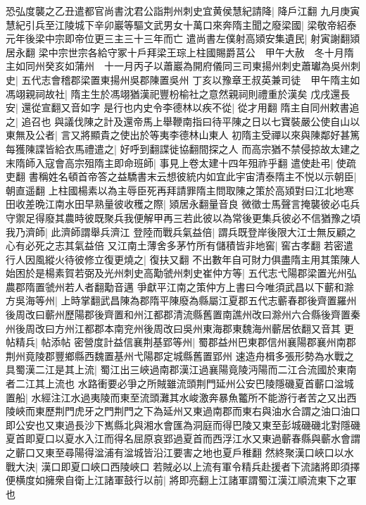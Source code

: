 恐弘度襲之乙丑遣都官尚書沈君公詣荆州刺史宜黄侯慧紀請降|{
	降戶江翻}
九月庚寅慧紀引兵至江陵城下辛卯巖等驅文武男女十萬口來奔隋主聞之廢梁國|{
	梁敬帝紹泰元年後梁中宗即帝位更三主三十三年而亡}
遣尚書左僕射高熲安集遺民|{
	射寅謝翻熲居永翻}
梁中宗世宗各給守冢十戶拜梁王琮上柱國賜爵莒公　甲午大赦　冬十月隋主如同州癸亥如蒲州　十一月丙子以蕭巖為開府儀同三司東揚州刺史蕭瓛為吳州刺史|{
	五代志會稽郡梁置東揚州吳郡陳置吳州}
丁亥以豫章王叔英兼司徒　甲午隋主如馮翊親祠故社|{
	隋主生於馮翊猶漢祀豐枌榆社之意然親祠則禮重於漢矣}
戊戌還長安|{
	還從宣翻又音如字}
是行也内史令李德林以疾不從|{
	從才用翻}
隋主自同州敕書追之|{
	追召也}
與議伐陳之計及還帝馬上舉鞭南指曰待平陳之日以七寶裝嚴公使自山以東無及公者|{
	言又將顯貴之使出於等夷李德林山東人}
初隋主受禪以來與陳鄰好甚篤每獲陳諜皆給衣馬禮遣之|{
	好呼到翻諜徙協翻間探之人}
而高宗猶不禁侵掠故太建之末隋師入寇會高宗殂隋主即命班師|{
	事見上卷太建十四年殂祚乎翻}
遣使赴弔|{
	使疏吏翻}
書稱姓名頓首帝答之益驕書末云想彼統内如宜此宇宙清泰隋主不悦以示朝臣|{
	朝直遥翻}
上柱國楊素以為主辱臣死再拜請罪隋主問取陳之策於高熲對曰江北地寒田收差晩江南水田早熟量彼收穫之際|{
	熲居永翻量音良}
微徵士馬聲言掩襲彼必屯兵守禦足得廢其農時彼既聚兵我便解甲再三若此彼以為常後更集兵彼必不信猶豫之頃我乃濟師|{
	此濟師謂舉兵濟江}
登陸而戰兵氣益倍|{
	謂兵既登岸後限大江士無反顧之心有必死之志其氣益倍}
又江南土薄舍多茅竹所有儲積皆非地窖|{
	窖古孝翻}
若密遣行人因風縱火待彼修立復更燒之|{
	復扶又翻}
不出數年自可財力俱盡隋主用其策陳人始困於是楊素賀若弼及光州刺史高勱虢州刺史崔仲方等|{
	五代志弋陽郡梁置光州弘農郡隋置虢州若人者翻勱音邁}
爭獻平江南之策仲方上書曰今唯須武昌以下蘄和滁方吳海等州|{
	上時掌翻武昌陳為郡隋平陳廢為縣屬江夏郡五代志蘄春郡後齊置羅州後周改曰蘄州歷陽郡後齊置和州江都郡清流縣舊置南譙州改曰滁州六合縣後齊置秦州後周改曰方州江都郡本南兖州後周改曰吳州東海郡東魏海州蘄居依翻又音其}
更帖精兵|{
	帖添帖}
密營度計益信襄荆基郢等州|{
	蜀郡益州巴東郡信州襄陽郡襄州南郡荆州竟陵郡豐鄉縣西魏置基州弋陽郡定城縣舊置郢州}
速造舟楫多張形勢為水戰之具蜀漢二江是其上流|{
	蜀江出三峽過南郡漢江過襄陽竟陵沔陽而二江合流國於東南者二江其上流也}
水路衝要必爭之所賊雖流頭荆門延州公安巴陵隱磯夏首蘄口湓城置船|{
	水經注江水過夷陵而東至流頭灘其水峻激奔暴魚龞所不能游行者苦之又出西陵峽而東歷荆門虎牙之門荆門之下為延州又東過南郡而東右與油水合謂之油口油口即公安也又東過長沙下嶲縣北與湘水會匯為洞庭而得巴陵又東至彭城磯磯北對隱磯夏首即夏口以夏水入江而得名屈原哀郢過夏首而西浮江水又東過蘄春縣與蘄水會謂之蘄口又東至尋陽得湓浦有湓城皆沿江要害之地也夏戶稚翻}
然終聚漢口峽口以水戰大決|{
	漢口即夏口峽口西陵峽口}
若賊必以上流有軍令精兵赴援者下流諸將即須擇便横度如擁衆自衛上江諸軍鼓行以前|{
	將即亮翻上江諸軍謂蜀江漢江順流東下之軍也}
